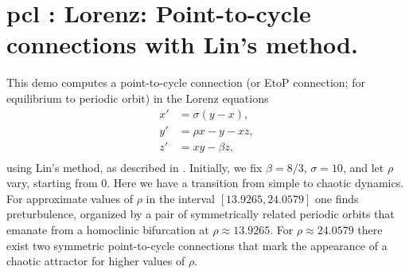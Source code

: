 \documentclass[12pt]{report}
\begin{document}
\section{ pcl : Lorenz: Point-to-cycle connections with Lin's method.} \label{sec:Demos_pcl}
This demo computes a point-to-cycle connection (or EtoP connection;
for equilibrium to periodic orbit) in the Lorenz equations
\begin{equation} \begin{array}{cl}
  x' &=  \sigma (y - x), \\
  y' &=  \rho x - y - x z,  \\
  z' &=  x y - \beta z, \\ \end{array} \end{equation}
using Lin's method, as described in 
\citeyear{KrRi:08}. Initially, we fix
$\beta=8/3$, $\sigma=10$, and let $\rho$ vary, starting from $0$.
Here we have a transition from simple to chaotic dynamics. For
approximate values of $\rho$ in the interval $[13.9265,24.0579]$
one finds preturbulence, organized by a pair of symmetrically
related periodic orbits that emanate from a homoclinic bifurcation
at $\rho\approx 13.9265$. For $\rho\approx 24.0579$ there exist
two symmetric point-to-cycle connections that mark the appearance
of a chaotic attractor for higher values of $\rho$.
\end{document}
